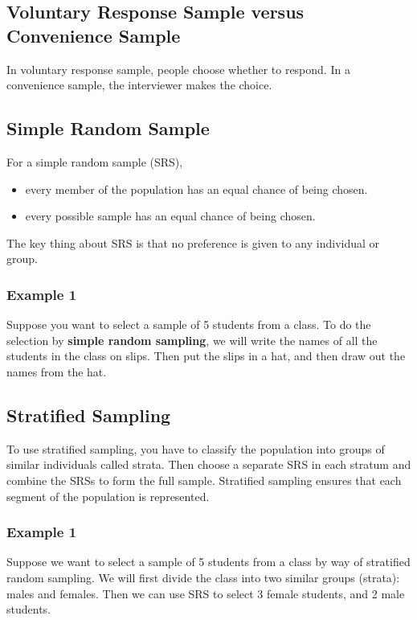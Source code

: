 \subsection{Voluntary Response Sample versus Convenience Sample}
In voluntary response sample, people choose whether to respond. In a convenience sample, the interviewer makes the choice.

\subsection{Simple Random Sample}
For a simple random sample (SRS),
\begin{itemize}
    \item every member of the population has an equal chance of being chosen.
    \item every possible sample has an equal chance of being chosen.
\end{itemize}

\noindent The key thing about SRS is that no preference is given to any individual or group.

\subsubsection*{Example 1}
Suppose you want to select a sample of 5 students from a class. To do the selection by \textbf{simple random sampling}, we will write the names of all the students in the class on slips. Then put the slips in a hat, and then draw out the names from the hat.

\subsection{Stratified Sampling}
To use stratified sampling, you have to classify the population into groups of similar individuals called strata. Then choose a separate SRS in each stratum and combine the SRSs to form the full sample. Stratified sampling ensures that each segment of the population is represented.

\subsubsection*{Example 1}
Suppose we want to select a sample of 5 students from a class by way of stratified random sampling. We will first divide the class into two similar groups (strata): males and females. Then we can use SRS to select 3 female students, and 2 male students. 





